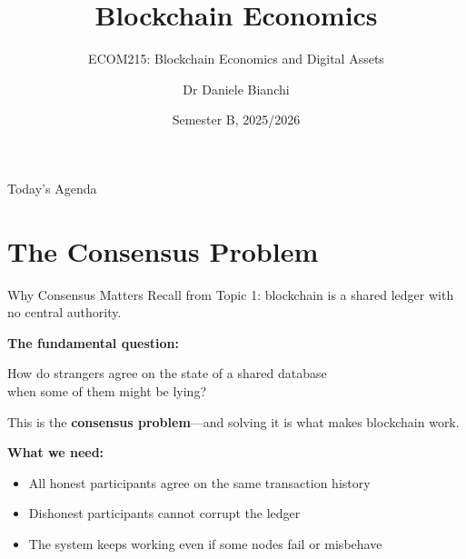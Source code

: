 \documentclass[10pt]{beamer}
\title{Blockchain Economics}
\subtitle{ECOM215: Blockchain Economics and Digital Assets}
\author{Dr Daniele Bianchi}
\institute{Queen Mary, University of London}
\date{Semester B, 2025/2026}
\newcommand{\highlight}[1]{\textcolor{AccentOrange}{\textbf{#1}}}
\begin{document}
\AtBeginSection[]{
  \begin{frame}[plain]
    \vfill
    \begin{center}
      {\Large\color{ImperialBlue}\insertsection}
    \end{center}
    \vfill
  \end{frame}
}

\begin{frame}[plain]
  \titlepage
\end{frame}

\begin{frame}{Today's Agenda}
  \tableofcontents
\end{frame}

\section{The Consensus Problem}

\begin{frame}{Why Consensus Matters}
  Recall from Topic 1: blockchain is a shared ledger with no central authority.
  
  \vspace{1em}
  \textbf{The fundamental question:}
  \begin{center}
    \large How do strangers agree on the state of a shared database\\when some of them might be lying?
  \end{center}
  
  \vspace{1em}
  This is the \highlight{consensus problem}---and solving it is what makes blockchain work.
  
  \vspace{1em}
  \textbf{What we need:}
  \begin{itemize}
    \item All honest participants agree on the same transaction history
    \item Dishonest participants cannot corrupt the ledger
    \item The system keeps working even if some nodes fail or misbehave
  \end{itemize}
\end{frame}
\end{document}
